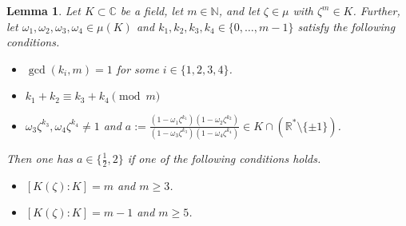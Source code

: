 \documentclass[a4paper]{amsart}
\newtheorem{lem}[theorem]{Lemma}
\theoremstyle{definition}
\numberwithin{equation}{section}
\numberwithin{theorem}{section}
\begin{document}
\begin{lem}\label{l3}
Let $K\subset{\mathbb{C}}$ be a field, let $m\in{\mathbb{N}}$, and let $\zeta\in\mu$ with
$\zeta^m\in K$. Further, let
$\omega_1,\omega_2,\omega_3,\omega_4\in\mu(K)$ and
$k_1,k_2,k_3,k_4\in\{0,\dots,m-1\}$ satisfy the following conditions.
\begin{itemize}
\item
$\operatorname{gcd}(k_i,m)=1$ for some $i\in\{1,2,3,4\}$.
\item
$k_1+k_2\equiv k_3+k_4 \pmod m$
\item
$\omega_3\zeta^{k_3},\omega_4\zeta^{k_4}\neq 1$ and $a:=\frac{(1-\omega_1\zeta^{k_1})(1-\omega_2\zeta^{k_2})}{(1-\omega_3\zeta^{k_3})(1-\omega_4\zeta^{k_4})}\in
K\cap ({\mathbb{R}}^*\setminus\{\pm 1 \})$.
\end{itemize}
Then one has $a\in\{\tfrac{1}{2},2\}$ if one of the following
conditions holds.
\begin{itemize}
\item[(a)]
$[K(\zeta) :K]=m$ and $m\geq 3$.
\item[(b)]
$[K(\zeta) :K]=m-1$ and $m\geq 5$.
\end{itemize}
\end{lem}
\end{document}
